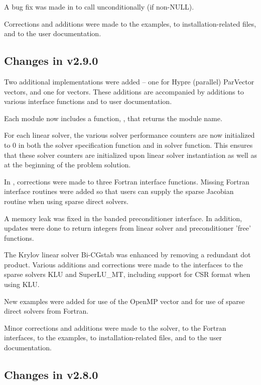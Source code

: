 A bug fix was made in  to call  unconditionally
(if non-NULL).

Corrections and additions were made to the examples,
to installation-related files,
and to the user documentation.


\subsection*{Changes in v2.9.0}

Two additional {\nvector} implementations were added -- one for
Hypre (parallel) ParVector vectors, and one for {\petsc} vectors.  These
additions are accompanied by additions to various interface functions
and to user documentation.

Each {\nvector} module now includes a function, ,
that returns the {\nvector} module name.

For each linear solver, the various solver performance counters are
now initialized to 0 in both the solver specification function and in
solver  function.  This ensures that these solver counters
are initialized upon linear solver instantiation as well as at the
beginning of the problem solution.

In {\fcvode}, corrections were made to three Fortran interface
functions.  Missing Fortran interface routines were added so that
users can supply the sparse Jacobian routine when using sparse direct
solvers.

A memory leak was fixed in the banded preconditioner interface.
In addition, updates were done to return integers from linear solver
and preconditioner 'free' functions.

The Krylov linear solver Bi-CGstab was enhanced by removing a redundant
dot product.  Various additions and corrections were made to the
interfaces to the sparse solvers KLU and SuperLU\_MT, including support
for CSR format when using KLU.

New examples were added for use of the OpenMP vector and for use of
sparse direct solvers from Fortran.

Minor corrections and additions were made to the {\cvode} solver, to the
Fortran interfaces, to the examples, to installation-related files,
and to the user documentation.

\subsection*{Changes in v2.8.0}

